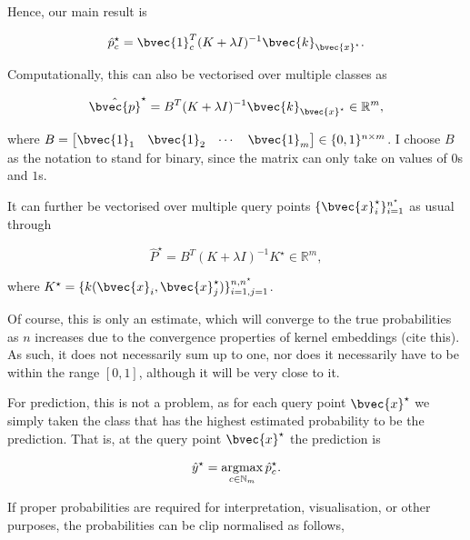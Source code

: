 \documentclass[a4paper, 12pt]{article}
\newcommand{\argmax}{\operatornamewithlimits{argmax}}
\begin{document}
	Hence, our main result is
	
	\begin{equation}
		\hat{p}^{\star}_{c} = \bvec{1}_{c}^{T} (K + \lambda I)^{-1} \bvec{k}_{\bvec{x}^{\star}}.
	\label{eq:probabilities}
	\end{equation}
	
	Computationally, this can also be vectorised over multiple classes as
	
	\begin{equation}
		\hat{\bvec{p}}^{\star} = B^{T} (K + \lambda I)^{-1} \bvec{k}_{\bvec{x}^{\star}} \in \mathbb{R}^{m},
	\end{equation}
	
	where $B = \begin{bmatrix} \bvec{1}_{1} & \bvec{1}_{2} & \cdots & \bvec{1}_{m} \end{bmatrix} \in \{0, 1\}^{n \times m}$. I choose $B$ as the notation to stand for binary, since the matrix can only take on values of $0$s and $1$s.
	
	It can further be vectorised over multiple query points $\{\bvec{x}^{\star}_{i}\}_{i = 1}^{n^{\star}}$ as usual through
	
	\begin{equation}
		\hat{P}^{\star} = B^{T} (K + \lambda I)^{-1} K^{\star} \in \mathbb{R}^{m},
	\end{equation}
	
	where $K^{\star} = \{k(\bvec{x}_{i}, \bvec{x}_{j}^{\star})\}_{i = 1, j = 1}^{n, n^{\star}}$.
	
	Of course, this is only an estimate, which will converge to the true probabilities as $n$ increases due to the convergence properties of kernel embeddings (cite this). As such, it does not necessarily sum up to one, nor does it necessarily have to be within the range $[0, 1]$, although it will be very close to it.
	
	For prediction, this is not a problem, as for each query point $\bvec{x}^{\star}$ we simply taken the class that has the highest estimated probability to be the prediction. That is, at the query point $\bvec{x}^{\star}$ the prediction is
	
	\begin{equation}
		\hat{y}^{\star} = \argmax_{c \in \mathbb{N}_{m}} \hat{p}_{c}^{\star}.
	\end{equation}
	
	If proper probabilities are required for interpretation, visualisation, or other purposes, the probabilities can be clip normalised as follows,
	
\end{document}
